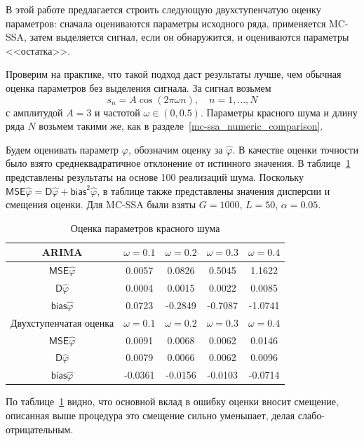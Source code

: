 \documentclass[specialist,
substylefile = spbu_report.rtx,
subf,href,colorlinks=true, 12pt]{disser}
\theoremstyle{definition}
\begin{document}
В этой работе предлагается строить следующую двухступенчатую оценку параметров: сначала оцениваются параметры исходного ряда, применяется MC-SSA, затем выделяется сигнал, если он обнаружится, и оцениваются параметры <<остатка>>.

Проверим на практике, что такой подход даст результаты лучше, чем обычная оценка параметров без выделения сигнала. За сигнал возьмем
\[
s_n=A\cos(2\pi\omega n),\quad n=1,\ldots,N
\]
с амплитудой $A=3$ и частотой $\omega\in(0,0.5)$. Параметры красного шума и длину ряда $N$ возьмем такими же, как в разделе~\ref{mc-ssa_numeric_comparison}.

Будем оценивать параметр $\varphi$, обозначим оценку за $\hat\varphi$. В качестве оценки точности было взято среднеквадратичное отклонение от истинного значения. В таблице~\ref{tab:param_estim} представлены результаты на основе 100 реализаций шума. Поскольку $\mathsf{MSE}\hat\varphi=\mathsf{D}\hat\varphi + \mathsf{bias}^2\hat\varphi$, в таблице также представлены значения дисперсии и смещения оценки. Для MC-SSA были взяты $G=1000$, $L=50$, $\alpha=0.05$. 

\begin{table}[h]
	\centering
	\begin{tabular}{ccccc}
		\hline
		ARIMA & $\omega = 0.1$ & $\omega=0.2$ & $\omega=0.3$ & $\omega=0.4$ \\
		\hline
		$\mathsf{MSE}\hat\varphi$ & 0.0057 & 0.0826 & 0.5045 & 1.1622\\
		\hline
		$\mathsf{D}\hat\varphi$ & 0.0004 & 0.0015 & 0.0022 & 0.0085 \\
		\hline
		$\mathsf{bias}\hat\varphi$ & 0.0723 & -0.2849 & -0.7087 & -1.0741 \\
		\hhline{=====}
		Двухступенчатая оценка & $\omega = 0.1$ & $\omega=0.2$ & $\omega=0.3$ & $\omega=0.4$ \\
		\hline
		$\mathsf{MSE}\hat\varphi$ & 0.0091 & 0.0068 & 0.0062 & 0.0146 \\
		\hline
		$\mathsf{D}\hat\varphi$ & 0.0079 & 0.0066 & 0.0062 & 0.0096 \\
		\hline
		$\mathsf{bias}\hat\varphi$ & -0.0361 & -0.0156 & -0.0103 & -0.0714 \\
		\hline
	\end{tabular}
	\caption{Оценка параметров красного шума}
	\label{tab:param_estim}
\end{table}

По таблице~\ref{tab:param_estim} видно, что основной вклад в ошибку оценки вносит смещение, описанная выше процедура это смещение сильно уменьшает, делая слабо-отрицательным.
\end{document}
